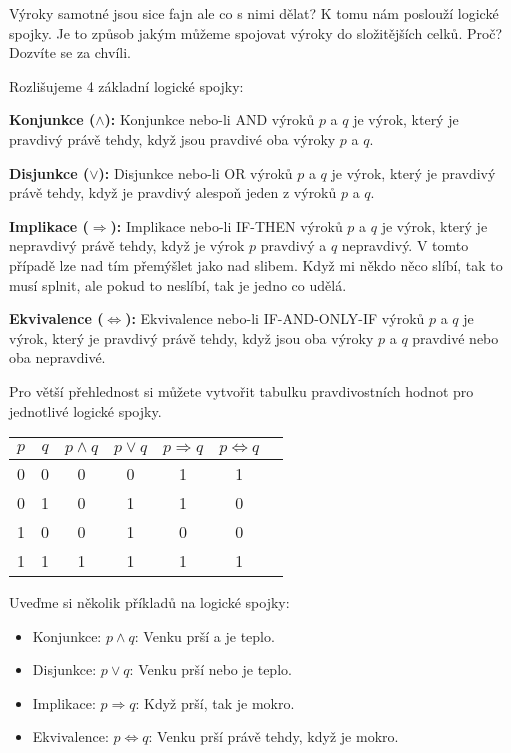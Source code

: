 Výroky samotné jsou sice fajn ale co s nimi dělat? K tomu nám poslouží logické spojky. Je to způsob jakým můžeme spojovat výroky do složitějších celků. Proč? Dozvíte se za chvíli.

\begin{definitionbox}
  Rozlišujeme 4 základní logické spojky:

  \textbf{Konjunkce ($\land$):} Konjunkce nebo-li AND výroků $p$ a $q$ je výrok, který je pravdivý právě tehdy, když jsou pravdivé oba výroky $p$ a $q$. 

  \textbf{Disjunkce ($\lor$):} Disjunkce nebo-li OR výroků $p$ a $q$ je výrok, který je pravdivý právě tehdy, když je pravdivý alespoň jeden z výroků $p$ a $q$.

  \textbf{Implikace ($\Rightarrow$):} Implikace nebo-li IF-THEN výroků $p$ a $q$ je výrok, který je nepravdivý právě tehdy, když je výrok $p$ pravdivý a $q$ nepravdivý. V tomto případě lze nad tím přemýšlet jako nad slibem. Když mi někdo něco slíbí, tak to musí splnit, ale pokud to neslíbí, tak je jedno co udělá.

  \textbf{Ekvivalence ($\Leftrightarrow$):} Ekvivalence nebo-li IF-AND-ONLY-IF výroků $p$ a $q$ je výrok, který je pravdivý právě tehdy, když jsou oba výroky $p$ a $q$ pravdivé nebo oba nepravdivé.

  \vspace{0.2cm}

  Pro větší přehlednost si můžete vytvořit tabulku pravdivostních hodnot pro jednotlivé logické spojky.

  \begin{center}
    \begin{tabular}{|c|c|c|c|c|c|c|}
      \hline
      $p$ & $q$ & $p \land q$ & $p \lor q$ & $p \Rightarrow q$ & $p \Leftrightarrow q$ \\
      \hline
      0 & 0 & 0 & 0 & 1 & 1 \\
      0 & 1 & 0 & 1 & 1 & 0 \\
      1 & 0 & 0 & 1 & 0 & 0 \\
      1 & 1 & 1 & 1 & 1 & 1 \\
      \hline
    \end{tabular}
  \end{center}
\end{definitionbox}

\pagebreak

\begin{example}
  Uveďme si několik příkladů na logické spojky:
  \begin{itemize}
    \item Konjunkce: $p \land q$: Venku prší a je teplo.
    \item Disjunkce: $p \lor q$: Venku prší nebo je teplo.
    \item Implikace: $p \Rightarrow q$: Když prší, tak je mokro.
    \item Ekvivalence: $p \Leftrightarrow q$: Venku prší právě tehdy, když je mokro.
  \end{itemize}
\end{example}

